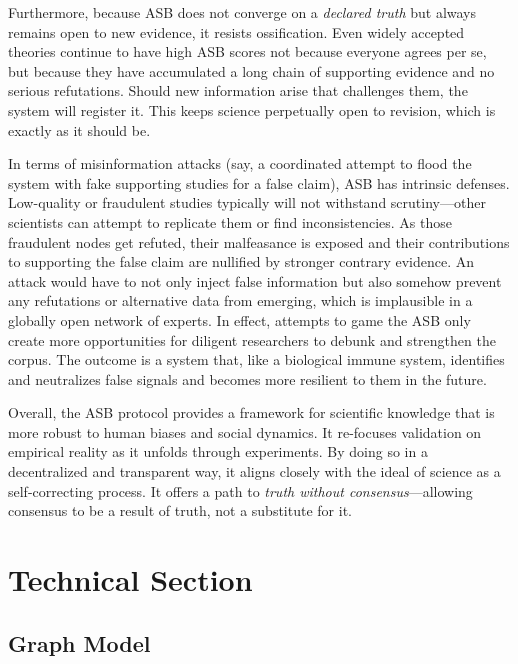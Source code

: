 \documentclass{article}
\begin{document}
Furthermore, because ASB does not converge on a \emph{declared truth} but always remains open to new evidence, it resists ossification. Even widely accepted theories continue to have high ASB scores not because everyone agrees per se, but because they have accumulated a long chain of supporting evidence and no serious refutations. Should new information arise that challenges them, the system will register it. This keeps science perpetually open to revision, which is exactly as it should be.

In terms of misinformation attacks (say, a coordinated attempt to flood the system with fake supporting studies for a false claim), ASB has intrinsic defenses. Low-quality or fraudulent studies typically will not withstand scrutiny—other scientists can attempt to replicate them or find inconsistencies. As those fraudulent nodes get refuted, their malfeasance is exposed and their contributions to supporting the false claim are nullified by stronger contrary evidence. An attack would have to not only inject false information but also somehow prevent any refutations or alternative data from emerging, which is implausible in a globally open network of experts. In effect, attempts to game the ASB only create more opportunities for diligent researchers to debunk and strengthen the corpus. The outcome is a system that, like a biological immune system, identifies and neutralizes false signals and becomes more resilient to them in the future.

Overall, the ASB protocol provides a framework for scientific knowledge that is more robust to human biases and social dynamics. It re-focuses validation on empirical reality as it unfolds through experiments. By doing so in a decentralized and transparent way, it aligns closely with the ideal of science as a self-correcting process. It offers a path to \emph{truth without consensus}—allowing consensus to be a result of truth, not a substitute for it.




\section{Technical Section}

\subsection{Graph Model}
\end{document}
